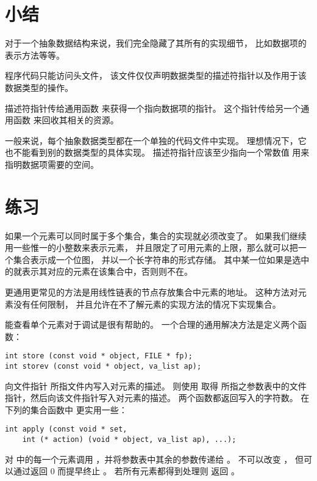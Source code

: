 \section{小结}
\label{sec:adtsum}
对于一个抽象数据结构来说，我们完全隐藏了其所有的实现细节，
比如数据项的表示方法等等。

程序代码只能访问头文件，
该文件仅仅声明数据类型的描述符指针以及作用于该数据类型的操作。

描述符指针传给通用函数  来获得一个指向数据项的指针。
这个指针传给另一个通用函数  来回收其相关的资源。

一般来说，每个抽象数据类型都在一个单独的代码文件中实现。
理想情况下，它也不能看到别的数据类型的具体实现。
描述符指针应该至少指向一个常数值 
用来指明数据项需要的空间。

\section{练习}
\label{sec:adtExer}
如果一个元素可以同时属于多个集合，集合的实现就必须改变了。
如果我们继续用一些惟一的小整数来表示元素，
并且限定了可用元素的上限，那么就可以把一个集合表示成一个位图，
并以一个长字符串的形式存储。
其中某一位如果是选中的就表示其对应的元素在该集合中，否则则不在。

更通用更常见的方法是用线性链表的节点存放集合中元素的地址。
这种方法对元素没有任何限制，
并且允许在不了解元素的实现方法的情况下实现集合。

能查看单个元素对于调试是很有帮助的。
一个合理的通用解决方法是定义两个函数：
\begin{lstlisting}
int store (const void * object, FILE * fp);
int storev (const void * object, va_list ap);
\end{lstlisting}
 向文件指针  所指文件内写入对元素的描述。
 则使用  取得 
所指之参数表中的文件指针，然后向该文件指针写入对元素的描述。
两个函数都返回写入的字符数。
在下列的集合函数中  更实用一些：
\begin{lstlisting}
int apply (const void * set,
	int (* action) (void * object, va_list ap), ...);
\end{lstlisting}
 对  中的每一个元素调用
，并将参数表中其余的参数传递给 。
 不可以改变 ，
但可以通过返回 0 而提早终止 。
若所有元素都得到处理则  返回 。

\newpage{\thispagestyle{empty}\cleardoublepage}

